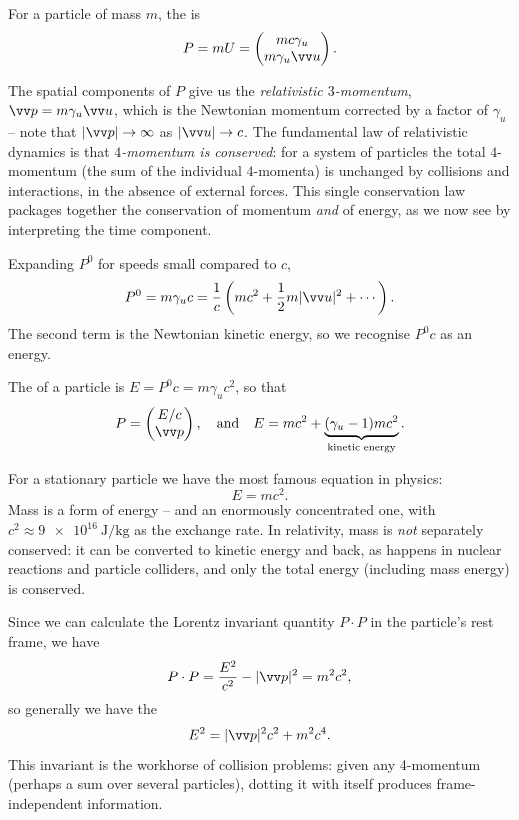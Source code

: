\begin{definition}[4-Momentum]
	For a particle of mass $m$, the  is
	$$
	P = mU = \begin{pmatrix}
		mc \gamma_u \\
		m \gamma_u \vv u
	\end{pmatrix}.
	$$
\end{definition}

The spatial components of $P$ give us the \emph{relativistic $3$-momentum}, $\vv p = m \gamma_u \vv u$, which is the Newtonian momentum corrected by a factor of $\gamma_u$ -- note that $|\vv p| \to \infty$ as $|\vv u| \to c$. The fundamental law of relativistic dynamics is that \emph{$4$-momentum is conserved}: for a system of particles the total $4$-momentum (the sum of the individual $4$-momenta) is unchanged by collisions and interactions, in the absence of external forces. This single conservation law packages together the conservation of momentum \emph{and} of energy, as we now see by interpreting the time component.

Expanding $P^0$ for speeds small compared to $c$,
$$
P^0 = m\gamma_u c = \frac{1}{c}\left(mc^2 + \frac{1}{2}m|\vv u|^2 + \cdots\right).
$$
The second term is the Newtonian kinetic energy, so we recognise $P^0 c$ as an energy.

\begin{definition}
	The  of a particle is $E = P^0 c = m\gamma_u c^2$, so that
	$$
	P = \begin{pmatrix}
		E/c \\ \vv p
	\end{pmatrix}, \quad \text{and} \quad E = mc^2 + \underbrace{(\gamma_u - 1)mc^2}_{\text{kinetic energy}}.
	$$
\end{definition}

For a stationary particle we have the most famous equation in physics:
$$
E = mc^2.
$$
Mass is a form of energy -- and an enormously concentrated one, with $c^2 \approx \SI{9e16}{\joule\per\kilogram}$ as the exchange rate. In relativity, mass is \emph{not} separately conserved: it can be converted to kinetic energy and back, as happens in nuclear reactions and particle colliders, and only the total energy (including mass energy) is conserved.

Since we can calculate the Lorentz invariant quantity $P \cdot P$ in the particle's rest frame, we have
$$
P \cdot P = \frac{E^2}{c^2} - |\vv p|^2 = m^2 c^2,
$$
so generally we have the 
$$
E^2 = |\vv p|^2 c^2 + m^2 c^4.
$$
This invariant is the workhorse of collision problems: given any 4-momentum (perhaps a sum over several particles), dotting it with itself produces frame-independent information.

